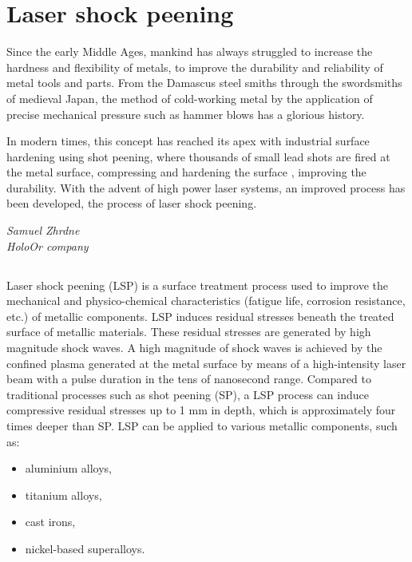﻿\chapter{Laser shock peening \label{chap:peening}}



\epigraph{Since the early Middle Ages, mankind has always struggled to increase the hardness and flexibility of metals, to improve the durability and reliability of  metal tools and parts. From the Damascus steel smiths through the swordsmiths of medieval Japan, the method of cold-working metal by the application of precise mechanical pressure such as hammer blows has a glorious history.

In modern times, this concept has reached its apex with industrial surface hardening using shot peening, where thousands of small lead shots are fired at the metal surface, compressing and hardening the surface , improving the durability. With the advent of high power laser systems, an improved process has been developed, the process of laser shock peening.}{\textit{Samuel Zhrdne\\ HoloOr company}}


\section*{}

Laser shock peening (LSP) is a surface treatment process used to improve the mechanical and physico-chemical characteristics (fatigue life, corrosion resistance, etc.) of metallic components. LSP induces residual stresses beneath the treated surface of metallic materials. These residual stresses are generated by high magnitude shock waves. A high magnitude of shock waves is achieved by the confined plasma generated at the metal surface by means of a high-intensity laser beam with a pulse duration in the tens of nanosecond range. Compared to traditional processes such as shot peening (SP), a LSP process can induce compressive residual stresses up to 1 mm in depth, which is approximately four times deeper than SP. LSP can be applied to various metallic components, such as:

\begin{itemize}
    \item aluminium alloys,
    \item titanium alloys,
    \item cast irons,
    \item nickel-based superalloys.
\end{itemize}

